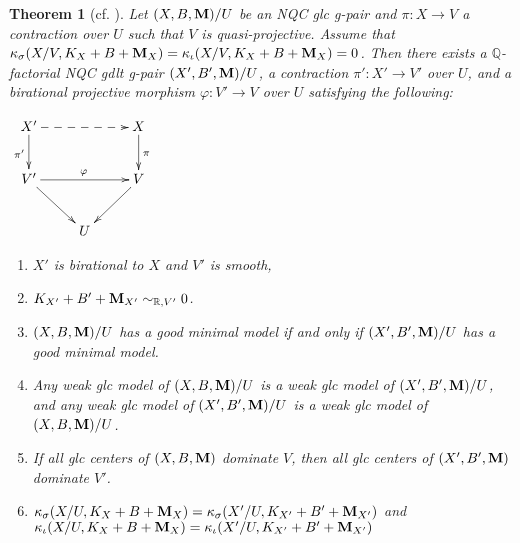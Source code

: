 \documentclass[11pt]{amsart}
\numberwithin{equation}{section}
\newcommand{\Mm}{{\bf{M}}}
\newcommand{\Qq}{\mathbb{Q}}
\newcommand{\Rr}{\mathbb{R}}
\newtheorem{thm}{Theorem}[section]
\theoremstyle{definition}
\theoremstyle{definition}
\theoremstyle{definition}
\begin{document}
\begin{thm}[{cf. \cite[Version 2, Theorem 4.1]{HL21}}]\label{thm: hl21 v2 4.1 abu ver}
Let $(X,B,\Mm)/U$ be an NQC glc g-pair and $\pi: X\rightarrow V$ a contraction over $U$ such that $V$ is quasi-projective. Assume that $\kappa_{\sigma}(X/V,K_X+B+\Mm_X)=\kappa_{\iota}(X/V,K_X+B+\Mm_X)=0$. Then there exists a $\Qq$-factorial NQC gdlt g-pair $(X',B',\Mm)/U$, a contraction $\pi': X'\rightarrow V'$ over $U$, and a birational projective morphism $\varphi: V'\rightarrow V$ over $U$ satisfying the following:
\begin{center}$\xymatrix{
X'\ar@{->}[d]_{\pi'}\ar@{-->}[rr]& & X\ar@{->}[d]^{\pi}\\
V'\ar@{->}[rr]^{\varphi}\ar@{->}[dr] & & V\ar@{->}[dl]\\
& U &
}$
\end{center}
\begin{enumerate}
    \item $X'$ is birational to $X$ and $V'$ is smooth,
    \item $K_{X'}+B'+\Mm_{X'}\sim_{\Rr,V'}0$.
    \item $(X,B,\Mm)/U$ has a good minimal model if and only if $(X',B',\Mm)/U$ has a good minimal model.
    \item Any weak glc model of $(X,B,\Mm)/U$ is a weak glc model of $(X',B',\Mm)/U$, and any weak glc model of $(X',B',\Mm)/U$ is a weak glc model of $(X,B,\Mm)/U$.
    \item If all glc centers of $(X,B,\Mm)$ dominate $V$, then all glc centers of $(X',B',\Mm)$ dominate $V'$.
    \item $\kappa_{\sigma}(X/U,K_X+B+\Mm_X)=\kappa_{\sigma}(X'/U,K_{X'}+B'+\Mm_{X'})$ and $\kappa_{\iota}(X/U,K_X+B+\Mm_X)=\kappa_{\iota}(X'/U,K_{X'}+B'+\Mm_{X'})$
\end{enumerate}
\end{thm}
\end{document}

